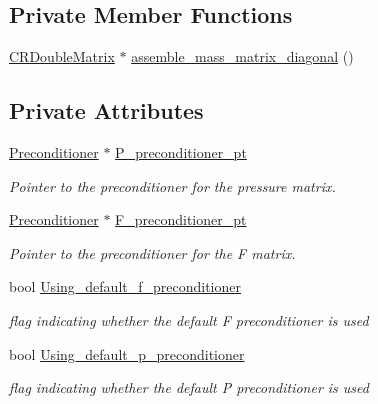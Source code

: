 \subsection*{Private Member Functions}
\begin{DoxyCompactItemize}
\item 
\hyperlink{classoomph_1_1CRDoubleMatrix}{C\+R\+Double\+Matrix} $\ast$ \hyperlink{classoomph_1_1PressureBasedSolidLSCPreconditioner_a2b32d66080ccfb3a464245d16bea6168}{assemble\+\_\+mass\+\_\+matrix\+\_\+diagonal} ()
\end{DoxyCompactItemize}
\subsection*{Private Attributes}
\begin{DoxyCompactItemize}
\item 
\hyperlink{classoomph_1_1Preconditioner}{Preconditioner} $\ast$ \hyperlink{classoomph_1_1PressureBasedSolidLSCPreconditioner_af72af32deaca30259e86eba2e04f16ed}{P\+\_\+preconditioner\+\_\+pt}
\begin{DoxyCompactList}\small\item\em Pointer to the \textquotesingle{}preconditioner\textquotesingle{} for the pressure matrix. \end{DoxyCompactList}\item 
\hyperlink{classoomph_1_1Preconditioner}{Preconditioner} $\ast$ \hyperlink{classoomph_1_1PressureBasedSolidLSCPreconditioner_a48598668a75faf5d983872f191288eb8}{F\+\_\+preconditioner\+\_\+pt}
\begin{DoxyCompactList}\small\item\em Pointer to the \textquotesingle{}preconditioner\textquotesingle{} for the F matrix. \end{DoxyCompactList}\item 
bool \hyperlink{classoomph_1_1PressureBasedSolidLSCPreconditioner_ad873e64fad712e74972d6dbc95b2eeb0}{Using\+\_\+default\+\_\+f\+\_\+preconditioner}
\begin{DoxyCompactList}\small\item\em flag indicating whether the default F preconditioner is used \end{DoxyCompactList}\item 
bool \hyperlink{classoomph_1_1PressureBasedSolidLSCPreconditioner_aca759bb66884df54c3ed5447357468e7}{Using\+\_\+default\+\_\+p\+\_\+preconditioner}
\begin{DoxyCompactList}\small\item\em flag indicating whether the default P preconditioner is used \end{DoxyCompactList}\item 

\end{DoxyCompactItemize}
